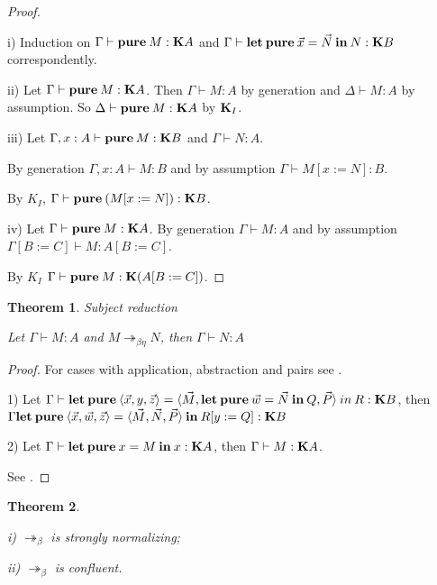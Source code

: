 \documentclass[a4paper]{article}
\newtheorem{theorem}{Theorem}
\begin{document}
\begin{proof}
  $ $

  i) Induction on $\Gamma \vdash {\bf pure \:} M : {\bf K}A$ and $\Gamma \vdash {\bf let \: pure \:} \vec{x} = \vec{N} {\: \bf in \:} N : {\bf K}B$ correspondently.

  ii) Let $\Gamma \vdash {\bf pure \:} M : {\bf K}A$. Then $\Gamma \vdash M : A$ by generation and $\Delta \vdash M : A$ by assumption. So $\Delta \vdash {\bf pure \:} M : {\bf K} A$ by ${\bf K}_I$.

  iii) Let $\Gamma, x : A \vdash {\bf pure \:} M : {\bf K}B$ and $\Gamma \vdash N : A$.

  By generation $\Gamma, x : A \vdash M : B$ and by assumption $\Gamma \vdash M [x := N] : B$.

  By $K_I$, $\Gamma \vdash {\bf pure \:} (M [x := N]) : {\bf K}B$.

  iv) Let $\Gamma \vdash {\bf pure \:} M : {\bf K}A$. By generation $\Gamma \vdash M : A$ and by assumption $\Gamma [B := C] \vdash M : A[B := C]$.

  By $K_I$ $\Gamma \vdash {\bf pure \:} M : {\bf K}(A[B := C])$.
\end{proof}

\begin{theorem} Subject reduction

  Let $\Gamma \vdash M : A$ and $M \twoheadrightarrow_{\beta \eta} N$, then $\Gamma \vdash N : A$

\end{theorem}

\begin{proof}
For cases with application, abstraction and pairs see \cite{Morten} \cite{Pierce}.

1)
  Let $\Gamma \vdash {\bf let \: pure \:} \langle \vec{x}, y, \vec{z} \rangle = \langle \vec{M}, {\bf let \: pure \: } \vec{w} = \vec{N} {\bf \: in \: } Q, \vec{P} \rangle {\: in \:} R : {\bf K}B$,
  then $\Gamma {\bf let \: pure \:} \langle \vec{x}, \vec{w}, \vec{z} \rangle = \langle \vec{M}, \vec{N}, \vec{P} \rangle \: { \bf in } \: R [y := Q] : {\bf K}B$

2) Let $\Gamma \vdash {\bf let \: pure \:} x = M {\: \bf in \: } x : {\bf K}A$, then $\Gamma \vdash M : {\bf K}A$.

See \cite{ModalK}.

\end{proof}

\begin{theorem}
  $ $

  i) $\twoheadrightarrow_{\beta}$ is strongly normalizing;

  ii) $\twoheadrightarrow_{\beta}$ is confluent.
\end{theorem}
\end{document}

